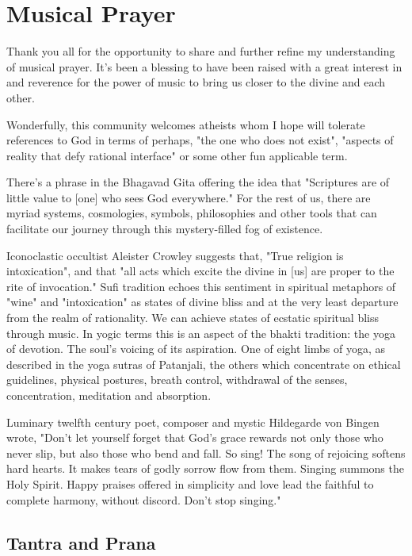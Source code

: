 \documentclass[12pt]{article}
\begin{document}
\section*{Musical Prayer}

Thank you all for  the opportunity to share and further refine my understanding of musical prayer. It's been a blessing to have been raised with a great interest in and reverence for the power of music to bring us closer to the divine and each other.

Wonderfully, this community welcomes atheists whom I hope will tolerate references to God in terms of perhaps, "the one who does not exist", "aspects of reality that defy rational interface" or some other fun applicable term.

There's a phrase in the Bhagavad Gita offering the idea that "Scriptures are of little value to [one] who sees God everywhere." For the rest of us, there are myriad systems, cosmologies, symbols, philosophies and other tools that can facilitate our journey through this mystery-filled fog of existence.

Iconoclastic occultist Aleister Crowley suggests that, "True religion is intoxication", and that "all acts which excite the divine in [us] are proper to the rite of invocation." Sufi tradition echoes this sentiment in spiritual metaphors of "wine" and "intoxication" as states of divine bliss and at the very least departure from the realm of rationality. We can achieve states of ecstatic spiritual bliss through music. In yogic terms this is an aspect of the bhakti tradition: the yoga of devotion. The soul's voicing of its aspiration. One of eight limbs of yoga, as described in the yoga sutras of Patanjali, the others which concentrate on ethical guidelines, physical postures, breath control, withdrawal of the senses, concentration, meditation and absorption.

Luminary twelfth century poet, composer and mystic Hildegarde von Bingen wrote, "Don't let yourself forget that God's grace rewards not only those who never slip, but also those who bend and fall. So sing! The song of rejoicing softens hard hearts. It makes tears of godly sorrow flow from them. Singing summons the Holy Spirit. Happy praises offered in simplicity and love lead the faithful to complete harmony, without discord. Don't stop singing."

\subsection*{Tantra and Prana}
\end{document}
